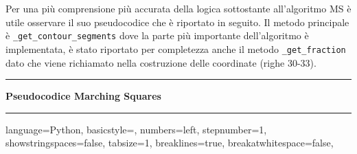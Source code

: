 \documentclass[12pt,a4paper]{report}
\begin{document}
Per una più comprensione più accurata della logica sottostante all'algoritmo MS è utile osservare il suo pseudocodice che è riportato in seguito. \newline
Il metodo principale è \verb|_get_contour_segments| dove la parte più importante dell'algoritmo è implementata, è stato riportato per completezza anche il metodo \verb|_get_fraction| dato che viene richiamato nella costruzione delle coordinate (righe 30-33). 
\\[10pt]
\noindent\rule[0.5ex]{\linewidth}{2pt}
\small{\textbf{Pseudocodice Marching Squares}} \\
\noindent\rule[0.5ex]{\linewidth}{1pt}
\lstset
{ %
    language=Python,
    basicstyle=\footnotesize,
    numbers=left,
    stepnumber=1,
    showstringspaces=false,
    tabsize=1,
    breaklines=true,
    breakatwhitespace=false,
}
\end{document}
